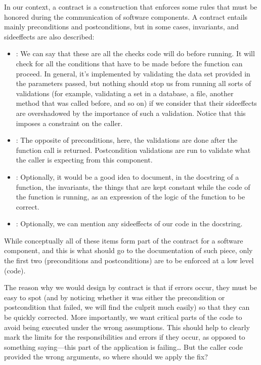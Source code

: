 \documentclass[a4paper,10pt,english]{sphinxmanual}
\begin{document}
In our context, a contract is a construction that enforces some rules that must be honored during the
communication of software components. A contract entails mainly preconditions and postconditions, but in some
cases, invariants, and side\sphinxhyphen{}effects are also described:
\begin{itemize}
\item {} 
: We can say that these are all the checks code will do before running. It will check for all the conditions that have to be made before the function can proceed. In general, it’s implemented by validating the data set provided in the parameters passed, but nothing should stop us from running all sorts of validations (for example, validating a set in a database, a file, another method that was called before, and so on) if we consider that their side\sphinxhyphen{}effects are overshadowed by the importance of such a validation. Notice that this imposes a constraint on the caller.

\item {} 
: The opposite of preconditions, here, the validations are done after the function call is returned. Postcondition validations are run to validate what the caller is expecting from this component.

\item {} 
: Optionally, it would be a good idea to document, in the docstring of a function, the invariants, the things that are kept constant while the code of the function is running, as an expression of the logic of the function to be correct.

\item {} 
: Optionally, we can mention any side\sphinxhyphen{}effects of our code in the docstring.

\end{itemize}

While conceptually all of these items form part of the contract for a software component, and this is what
should go to the documentation of such piece, only the first two (preconditions and postconditions) are to be
enforced at a low level (code).

The reason why we would design by contract is that if errors occur, they must
be easy to spot (and by noticing whether it was either the precondition or postcondition that failed, we will
find the culprit much easily) so that they can be quickly corrected. More importantly, we want critical parts
of the code to avoid being executed under the wrong assumptions. This should help to clearly mark the limits
for the responsibilities and errors if they occur, as opposed to something saying—this part of the application
is failing… But the caller code provided the wrong arguments, so where should we apply the fix?
\end{document}
